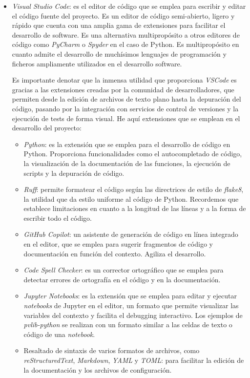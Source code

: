 \begin{itemize}
    \item \textit{Visual Studio Code}: es el editor de código que se emplea para escribir y editar el código fuente del proyecto. Es un editor de código semi-abierto, ligero y rápido que cuenta con una amplia gama de extensiones para facilitar el desarrollo de software. Es una alternativa multipropósito a otros editores de código como \textit{PyCharm} o \textit{Spyder} en el caso de Python. Es multipropósito en cuanto admite el desarrollo de muchísimos lenguajes de programación y ficheros ampliamente utilizados en el desarrollo software.
    
    Es importante denotar que la inmensa utilidad que proporciona \textit{VSCode} es gracias a las extensiones creadas por la comunidad de desarrolladores, que permiten desde la edición de archivos de texto plano hasta la depuración del código, pasando por la integración con servicios de control de versiones y la ejecución de tests de forma visual. He aquí extensiones que se emplean en el desarrollo del proyecto:
          \begin{itemize}
              \item \textit{Python}: es la extensión que se emplea para el desarrollo de código en Python. Proporciona funcionalidades como el autocompletado de código, la visualización de la documentación de las funciones, la ejecución de scripts y la depuración de código.
              \item \textit{Ruff}: permite formatear el código según las directrices de estilo de \textit{flake8}, la utilidad que da estilo uniforme al código de Python. Recordemos que establece limitaciones en cuanto a la longitud de las líneas y a la forma de escribir todo el código.
              \item \textit{GitHub Copilot}: un asistente de generación de código en línea integrado en el editor, que se emplea para sugerir fragmentos de código y documentación en función del contexto. Agiliza el desarrollo.
              \item \textit{Code Spell Checker}: es un corrector ortográfico que se emplea para detectar errores de ortografía en el código y en la documentación.
              \item \textit{Jupyter Notebooks}: es la extensión que se emplea para editar y ejecutar \textit{notebooks} de Jupyter en el editor, un formato que permite visualizar las variables del contexto y facilita el debugging interactivo. Los ejemplos de \textit{pvlib-python} se realizan con un formato similar a las celdas de texto o código de una \textit{notebook}.
              \item Resaltado de sintaxis de varios formatos de archivos, como \textit{reStructuredText}, \textit{Markdown}, \textit{YAML} y \textit{TOML}: para facilitar la edición de la documentación y los archivos de configuración.


\end{itemize}
\end{itemize}
